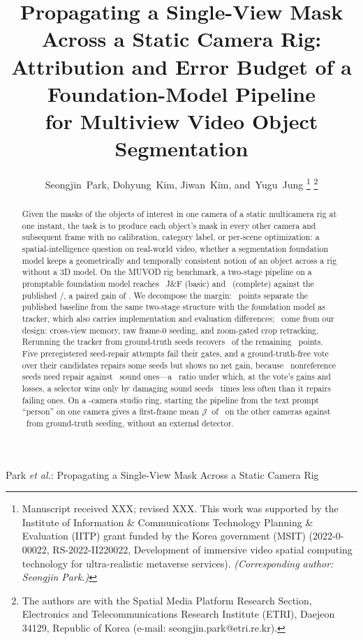 \documentclass[journal]{IEEEtran}
\newcommand{\Jscore}{\ensuremath{\mathcal{J}}}
\begin{document}
\title{Propagating a Single-View Mask Across a Static Camera Rig:\\
Attribution and Error Budget of a Foundation-Model Pipeline\\for Multiview Video Object Segmentation}

\author{Seongjin~Park, Dohyung~Kim, Jiwan~Kim, and~Yugu~Jung%
\thanks{Manuscript received XXX; revised XXX. This work was supported by the
Institute of Information \& Communications Technology Planning \& Evaluation
(IITP) grant funded by the Korea government (MSIT) (2022-0-00022,
RS-2022-II220022, Development of immersive video spatial computing technology
for ultra-realistic metaverse services). \emph{(Corresponding author: Seongjin
Park.)}}%
\thanks{The authors are with the Spatial Media Platform Research Section,
Electronics and Telecommunications Research Institute (ETRI), Daejeon 34129,
Republic of Korea (e-mail: seongjin.park@etri.re.kr).}}

%
{Park \MakeLowercase{\textit{et al.}}: Propagating a Single-View Mask Across a Static Camera Rig}

\maketitle

\begin{abstract}
Given the masks of the objects of interest in one camera of a static
multicamera rig at one instant, the task is to produce each object's mask in
every other camera and subsequent frame with no calibration, category label,
or per-scene optimization: a spatial-intelligence question on real-world
video, whether a segmentation foundation model keeps a geometrically and
temporally consistent notion of an object across a rig without a 3D model. On
the MUVOD rig benchmark, a two-stage pipeline on a promptable foundation model
reaches \OursBasic\ J\&F (basic) and \OursComplete\ (complete) against the
published \XMemBasic/\XMemComplete, a paired gain of \DeltaBasic. We decompose
the margin: \gainFoundation\ points separate the published baseline from the
same two-stage structure with the foundation model as tracker, which also
carries implementation and evaluation differences; \gainOurs\ come from our
design: cross-view memory, raw frame-0 seeding, and zoom-gated crop
retracking. Rerunning the tracker from ground-truth seeds recovers
\gtSeedHeadlineDelta\ of the remaining \totalGap\ points. Five preregistered
seed-repair attempts fail their gates, and a ground-truth-free vote over their
candidates repairs some seeds but shows no net gain, because \nFzero\
nonreference seeds need repair against \nNzero\ sound ones---a \asymmetry\
ratio under which, at the vote's gains and losses, a selector wins only by
damaging sound seeds \breakEvenTimes\ times less often than it repairs
failing ones. On a \plenCams-camera studio ring, starting the pipeline from
the text prompt ``person'' on one camera gives a first-frame mean \Jscore\
of \plenJtxt\ on the other cameras against \plenJgt\ from ground-truth
seeding, without an external detector.
\end{abstract}
\end{document}
